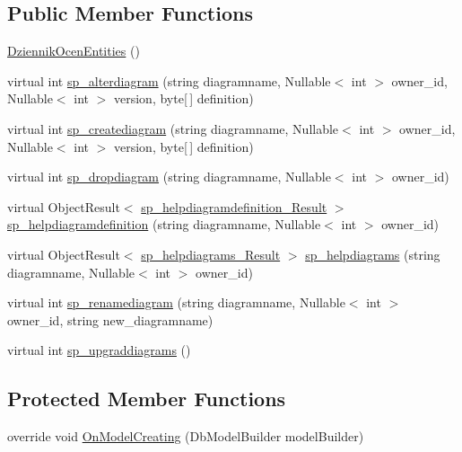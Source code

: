 \subsection*{Public Member Functions}
\begin{DoxyCompactItemize}
\item 
\hyperlink{class_dziennik_ocen_1_1_dziennik_ocen_entities_ac3342686c2273ce2aa63726dd18c30de}{Dziennik\+Ocen\+Entities} ()
\item 
virtual int \hyperlink{class_dziennik_ocen_1_1_dziennik_ocen_entities_a1a8b451c6e153204c17b2e71110e8c34}{sp\+\_\+alterdiagram} (string diagramname, Nullable$<$ int $>$ owner\+\_\+id, Nullable$<$ int $>$ version, byte\mbox{[}$\,$\mbox{]} definition)
\item 
virtual int \hyperlink{class_dziennik_ocen_1_1_dziennik_ocen_entities_a044325cc04f005d56d4cf3d461ad2ee3}{sp\+\_\+creatediagram} (string diagramname, Nullable$<$ int $>$ owner\+\_\+id, Nullable$<$ int $>$ version, byte\mbox{[}$\,$\mbox{]} definition)
\item 
virtual int \hyperlink{class_dziennik_ocen_1_1_dziennik_ocen_entities_aef7fc0cd2e463ccf54e1967825e2c4f8}{sp\+\_\+dropdiagram} (string diagramname, Nullable$<$ int $>$ owner\+\_\+id)
\item 
virtual Object\+Result$<$ \hyperlink{class_dziennik_ocen_1_1sp__helpdiagramdefinition___result}{sp\+\_\+helpdiagramdefinition\+\_\+\+Result} $>$ \hyperlink{class_dziennik_ocen_1_1_dziennik_ocen_entities_a1a08762b12fdba65c46dc89808a036f2}{sp\+\_\+helpdiagramdefinition} (string diagramname, Nullable$<$ int $>$ owner\+\_\+id)
\item 
virtual Object\+Result$<$ \hyperlink{class_dziennik_ocen_1_1sp__helpdiagrams___result}{sp\+\_\+helpdiagrams\+\_\+\+Result} $>$ \hyperlink{class_dziennik_ocen_1_1_dziennik_ocen_entities_ae183901a590f1c4ac6925f9749881082}{sp\+\_\+helpdiagrams} (string diagramname, Nullable$<$ int $>$ owner\+\_\+id)
\item 
virtual int \hyperlink{class_dziennik_ocen_1_1_dziennik_ocen_entities_ab357421964b49d95a9410ccc0f381214}{sp\+\_\+renamediagram} (string diagramname, Nullable$<$ int $>$ owner\+\_\+id, string new\+\_\+diagramname)
\item 
virtual int \hyperlink{class_dziennik_ocen_1_1_dziennik_ocen_entities_a8bf06603c78ada012177682f17a8315d}{sp\+\_\+upgraddiagrams} ()
\end{DoxyCompactItemize}
\subsection*{Protected Member Functions}
\begin{DoxyCompactItemize}
\item 
override void \hyperlink{class_dziennik_ocen_1_1_dziennik_ocen_entities_a30945a5af85b1d25e95b6734a577df42}{On\+Model\+Creating} (Db\+Model\+Builder model\+Builder)
\end{DoxyCompactItemize}

